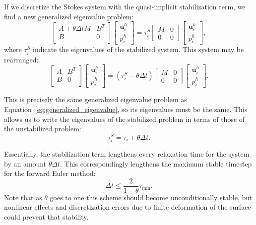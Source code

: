 \documentclass[preprint,12pt,authoryear]{elsarticle}
\begin{document}
If we discretize the Stokes system with the quasi-implicit stabilization term, we find
a new generalized eigenvalue problem:
\begin{equation}
\begin{bmatrix}
A + \theta \Delta t M & B^T \\
B & 0 \\
\end{bmatrix}
\begin{bmatrix}
\mathbf{u}^h_i \\
p^h_i
\end{bmatrix}
=
\tau^S_i
\begin{bmatrix}
M & 0 \\
0 & 0
\end{bmatrix}
\begin{bmatrix}
\mathbf{u}^h_i \\
p^h_i
\end{bmatrix},
\label{eq:stabilized_generalized_eigenvalue}
\end{equation}
where $\tau^S_i$ indicate the eigenvalues of the stabilized system.
This system may be rearranged:
\begin{equation}
\begin{bmatrix}
A & B^T \\
B & 0 \\
\end{bmatrix}
\begin{bmatrix}
\mathbf{u}^h_i \\
p^h_i
\end{bmatrix}
=
\left(\tau^S_i - \theta \Delta t \right)
\begin{bmatrix}
M & 0 \\
0 & 0
\end{bmatrix}
\begin{bmatrix}
\mathbf{u}^h_i \\
p^h_i
\end{bmatrix}.
\label{eq:rearranged_stabilized_generalized_eigenvalue}
\end{equation}

This is precisely the same generalized eigenvalue problem as Equation~\eqref{eq:generalized_eigenvalue},
so its eigenvalues must be the same.  This allows us to write the eigenvalues of the stabilized problem in
terms of those of the unstabilized problem:
\begin{equation}
\tau^S_i = \tau_i + \theta \Delta t.
\label{eq:spectrum_shift}
\end{equation}

Essentially, the stabilization term lengthens every relaxation time for the system by an amount $\theta \Delta t$.
This correspondingly lengthens the maximum stable timestep for the forward Euler method:
\begin{equation}
\Delta t  \le \frac{2}{1-\theta} \tau_{\mathrm{min}}.
\label{eq:cfl_euler_stabilized}
\end{equation}
Note that as $\theta$ goes to one this scheme should become unconditionally stable,
but nonlinear effects and discretization errors due to finite deformation of the surface could 
prevent that stability.
\end{document}

